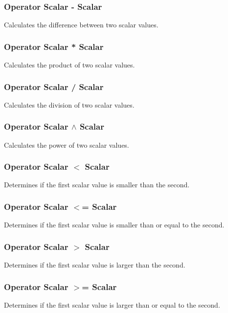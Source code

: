 \subsubsection{Operator Scalar - Scalar \label{O:Scalar-Scalar}}
Calculates the difference between two scalar values.

\subsubsection{Operator Scalar * Scalar \label{O:Scalar*Scalar}}
Calculates the product of two scalar values.

\subsubsection{Operator Scalar / Scalar \label{O:Scalar/Scalar}}
Calculates the division of two scalar values.

\subsubsection{Operator Scalar $\wedge$ Scalar \label{O:Scalar^Scalar}}
Calculates the power of two scalar values.

\subsubsection{Operator Scalar $<$ Scalar \label{O:Scalar<Scalar}}
Determines if the first scalar value is smaller than the second.

\subsubsection{Operator Scalar $<$= Scalar \label{O:Scalar<=Scalar}}
Determines if the first scalar value is smaller than or equal to the second.

\subsubsection{Operator Scalar $>$ Scalar \label{O:Scalar>Scalar}}
Determines if the first scalar value is larger than the second.

\subsubsection{Operator Scalar $>$= Scalar \label{O:Scalar>=Scalar}}
Determines if the first scalar value is larger than or equal to the second.

